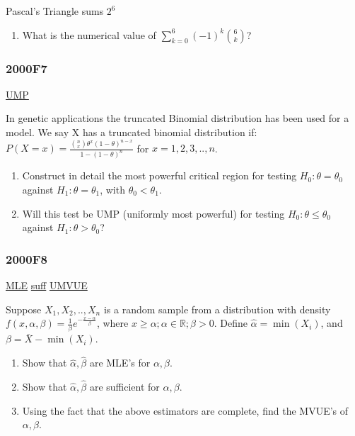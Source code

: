 \documentclass[10pt,twocolumn,portrait]{article}
\providecommand{\tightlist}{%
  \setlength{\itemsep}{0pt}\setlength{\parskip}{0pt}}
\begin{document}
Pascal's Triangle sums \(2^6\)

\begin{enumerate}
\def\labelenumi{\Alph{enumi})}
\setcounter{enumi}{1}
\tightlist
\item
  What is the numerical value of \(\sum_{k=0}^6(-1)^k\binom{6}{k}\)?
\end{enumerate}

\hypertarget{f7}{%
\subsubsection{2000F7}\label{f7}}

\protect\hyperlink{section-7}{UMP}

In genetic applications the truncated Binomial distribution has been
used for a model. We say X has a truncated binomial distribution if:
\(P(X=x)=\frac{\binom{n}{x}\theta^x(1-\theta)^{n-x}}{1-(1-\theta)^n}\)
for \(x=1,2,3,..,n\).

\begin{enumerate}
\def\labelenumi{\Alph{enumi})}
\item
  Construct in detail the most powerful critical region for testing
  \(H_0:\theta=\theta_0\) against \(H_1:\theta=\theta_1\), with
  \(\theta_0<\theta_1\).
\item
  Will this test be UMP (uniformly most powerful) for testing
  \(H_0:\theta\le\theta_0\) against \(H_1:\theta>\theta_0\)?
\end{enumerate}

\hypertarget{f8}{%
\subsubsection{2000F8}\label{f8}}

\protect\hyperlink{MLE}{MLE} \protect\hyperlink{section-6}{suff}
\protect\hyperlink{section-5}{UMVUE}

Suppose \(X_1,X_2,..,X_n\) is a random sample from a distribution with
density \(f(x,\alpha,\beta)=\frac1{\beta}e^{-\frac{x-\alpha}\beta}\),
where \(x\ge\alpha;\alpha\in\mathbb R;\beta>0\). Define
\(\hat\alpha=\min(X_i)\), and \(\beta=\bar X-\min(X_i)\).

\begin{enumerate}
\def\labelenumi{\Alph{enumi})}
\item
  Show that \(\hat\alpha,\hat\beta\) are MLE's for \(\alpha,\beta\).
\item
  Show that \(\hat\alpha,\hat\beta\) are sufficient for
  \(\alpha,\beta\).
\item
  Using the fact that the above estimators are complete, find the MVUE's
  of \(\alpha,\beta\).
\end{enumerate}
\end{document}
